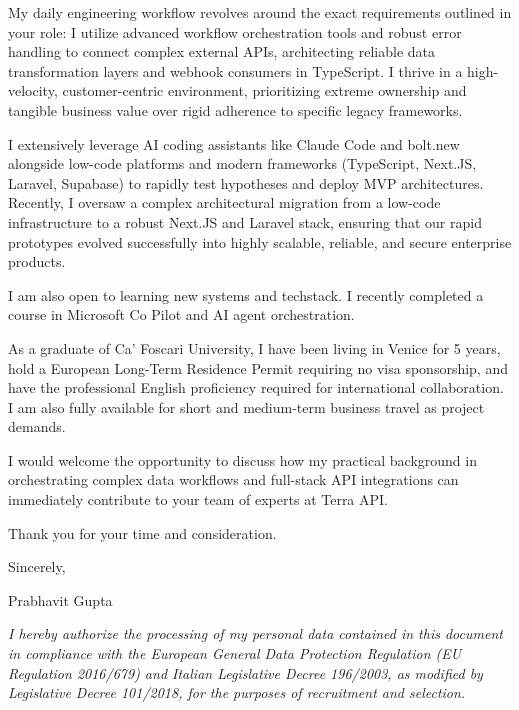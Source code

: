 \documentclass[11pt, a4paper]{article}
\begin{document}
\vspace{0.3cm}
\noindent My daily engineering workflow revolves around the exact requirements outlined in your role: I utilize advanced workflow orchestration tools and robust error handling to connect complex external APIs, architecting reliable data transformation layers and webhook consumers in TypeScript. I thrive in a high-velocity, customer-centric environment, prioritizing extreme ownership and tangible business value over rigid adherence to specific legacy frameworks.

\vspace{0.3cm}
\noindent I extensively leverage AI coding assistants like Claude Code and bolt.new alongside low-code platforms and modern frameworks (TypeScript, Next.JS, Laravel, Supabase) to rapidly test hypotheses and deploy MVP architectures. Recently, I oversaw a complex architectural migration from a low-code infrastructure to a robust Next.JS and Laravel stack, ensuring that our rapid prototypes evolved successfully into highly scalable, reliable, and secure enterprise products.

\vspace{0.3cm}
\noindent I am also open to learning new systems and techstack. I recently completed a course in Microsoft Co Pilot and AI agent orchestration.

\vspace{0.3cm}
\noindent As a graduate of Ca' Foscari University, I have been living in Venice for 5 years, hold a European Long-Term Residence Permit requiring no visa sponsorship, and have the professional English proficiency required for international collaboration. I am also fully available for short and medium-term business travel as project demands.

\vspace{0.3cm}
\noindent I would welcome the opportunity to discuss how my practical background in orchestrating complex data workflows and full-stack API integrations can immediately contribute to your team of experts at Terra API.

\vspace{0.3cm}
\noindent Thank you for your time and consideration.

\vspace{0.5cm}
\noindent Sincerely,

\vspace{0.3cm}
\noindent Prabhavit Gupta

\vspace{0.5cm}
\noindent \textit{I hereby authorize the processing of my personal data contained in this document in compliance with the European General Data Protection Regulation (EU Regulation 2016/679) and Italian Legislative Decree 196/2003, as modified by Legislative Decree 101/2018, for the purposes of recruitment and selection.}
\end{document}
